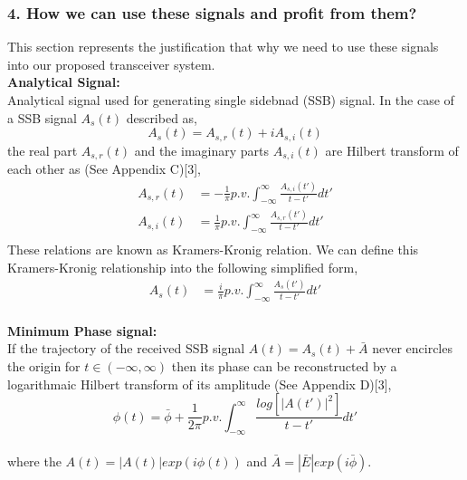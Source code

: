 \subsubsection{4. How we can use these signals and profit from them?}
This section represents the justification that why we need to use these signals into our proposed transceiver system.\\
\textbf{Analytical Signal:}\\
Analytical signal used for generating single sidebnad (SSB) signal. In the case of a SSB signal $A_s(t)$ described as,
\begin{equation}
A_s(t)=A_{s,r}(t)+iA_{s,i}(t)
\label{5.15}
\end{equation}
the real part $A_{s,r}(t)$  and the imaginary parts $A_{s,i}(t)$ are Hilbert transform of each other as (See Appendix C)[3],
\begin{equation}
\begin{split}
A_{s,r}(t) &=-\frac{1}{\pi} p.v. \int_{-\infty}^{\infty} \frac{A_{s,i}(t')}{t-t'} dt' \\
A_{s,i}(t) &=\frac{1}{\pi} p.v. \int_{-\infty}^{\infty} \frac{A_{s,r}(t')}{t-t'} dt' \\
\end{split}
\label{E}
\end{equation}
These relations are known as Kramers-Kronig relation. We can define this Kramers-Kronig relationship into the following simplified form,
\begin{equation}
\begin{split}
A_{s}(t) &=\frac{i}{\pi} p.v. \int_{-\infty}^{\infty} \frac{A_{s}(t')}{t-t'} dt' 
\end{split}
\label{Eq:5.17}
\end{equation}\\
\textbf{Minimum Phase signal:}\\
If the trajectory of the received SSB signal $A(t)=A_{s}(t)+\bar{A}$ never encircles the origin for $t\in(-\infty,\infty)$ then its phase can be reconstructed by a logarithmaic Hilbert transform of its amplitude (See Appendix D)[3],
\begin{equation}
\phi(t) = \bar{\phi} + \dfrac{1}{2\pi} p.v. \int_{-\infty}^{\infty} \dfrac{log[|A(t')|^2]}{t-t'} dt'
\end{equation}\\
where the $A(t)=|A(t)|exp(i\phi(t))$ and $\bar{A}=|\bar{E}|exp(i\bar{\phi})$.







